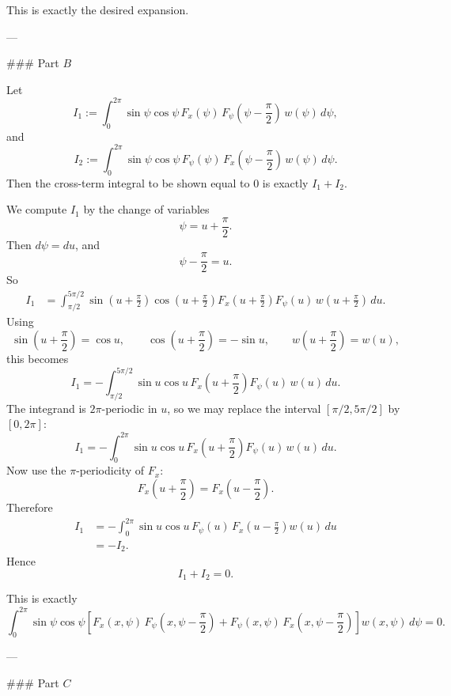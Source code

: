 This is exactly the desired expansion.

---

### Part \(B\)

Let
\[
I_1:=\int_0^{2\pi}\sin\psi\cos\psi\,F_x(\psi)\,F_\psi\!\left(\psi-\frac{\pi}{2}\right)\,w(\psi)\,d\psi,
\]
and
\[
I_2:=\int_0^{2\pi}\sin\psi\cos\psi\,F_\psi(\psi)\,F_x\!\left(\psi-\frac{\pi}{2}\right)\,w(\psi)\,d\psi.
\]
Then the cross-term integral to be shown equal to \(0\) is exactly \(I_1+I_2\).

We compute \(I_1\) by the change of variables
\[
\psi=u+\frac{\pi}{2}.
\]
Then \(d\psi=du\), and
\[
\psi-\frac{\pi}{2}=u.
\]
So
\[
\begin{aligned}
I_1
&=
\int_{\pi/2}^{5\pi/2}
\sin\!\left(u+\frac{\pi}{2}\right)\cos\!\left(u+\frac{\pi}{2}\right)
F_x\!\left(u+\frac{\pi}{2}\right)
F_\psi(u)\,
w\!\left(u+\frac{\pi}{2}\right)\,du.
\end{aligned}
\]
Using
\[
\sin\!\left(u+\frac{\pi}{2}\right)=\cos u,\qquad
\cos\!\left(u+\frac{\pi}{2}\right)=-\sin u,
\qquad
w\!\left(u+\frac{\pi}{2}\right)=w(u),
\]
this becomes
\[
I_1
=
-\int_{\pi/2}^{5\pi/2}
\sin u\cos u\,
F_x\!\left(u+\frac{\pi}{2}\right)
F_\psi(u)\,
w(u)\,du.
\]
The integrand is \(2\pi\)-periodic in \(u\), so we may replace the interval \([\pi/2,5\pi/2]\) by \([0,2\pi]\):
\[
I_1
=
-\int_0^{2\pi}
\sin u\cos u\,
F_x\!\left(u+\frac{\pi}{2}\right)
F_\psi(u)\,
w(u)\,du.
\]
Now use the \(\pi\)-periodicity of \(F_x\):
\[
F_x\!\left(u+\frac{\pi}{2}\right)=F_x\!\left(u-\frac{\pi}{2}\right).
\]
Therefore
\[
\begin{aligned}
I_1
&=
-\int_0^{2\pi}
\sin u\cos u\,
F_\psi(u)\,
F_x\!\left(u-\frac{\pi}{2}\right)
w(u)\,du\\
&=-I_2.
\end{aligned}
\]
Hence
\[
I_1+I_2=0.
\]

This is exactly
\[
\int_0^{2\pi}\sin\psi\cos\psi
\left[
F_x(x,\psi)\,F_\psi\!\left(x,\psi-\frac{\pi}{2}\right)
+
F_\psi(x,\psi)\,F_x\!\left(x,\psi-\frac{\pi}{2}\right)
\right]
w(x,\psi)\,d\psi
=0.
\]

---

### Part \(C\)

